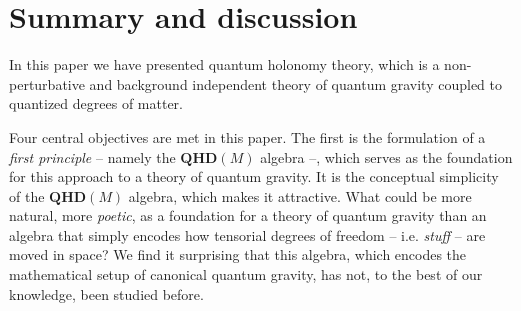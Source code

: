 \documentclass[12pt]{article}
\begin{document}




































\section{Summary and discussion}
\label{DIS}


In this paper we have presented quantum holonomy theory, which is a non-perturbative and background independent theory of quantum gravity coupled to quantized degrees of matter.%


Four central objectives are met in this paper. The first is the formulation of a {\it first principle} -- namely the $\mathbf{QHD}(M) $ algebra --, which serves as the foundation for this approach to a theory of quantum gravity.
%
%
 It is the conceptual simplicity of the $\mathbf{QHD}(M) $ algebra, which makes it attractive. What could be more natural, more {\it poetic}, as a foundation for a theory of quantum gravity than an algebra that simply encodes how tensorial degrees of freedom -- i.e. {\it stuff} -- are moved in space? We find it surprising that this algebra, which encodes the mathematical setup of canonical quantum gravity, has not, to the best of our knowledge, been studied before.   %
\end{document}
